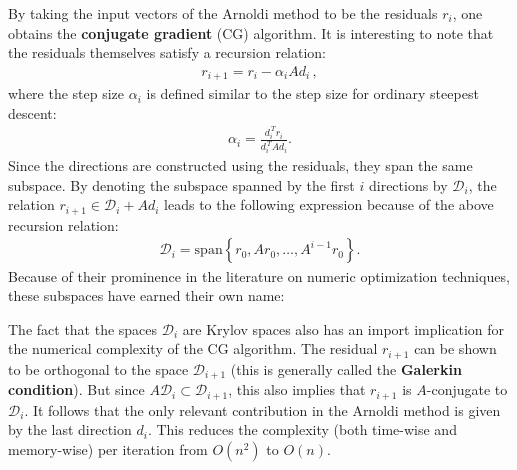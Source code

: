     By taking the input vectors of the Arnoldi method to be the residuals $r_i$, one obtains the \textbf{conjugate gradient} (CG) algorithm. It is interesting to note that the residuals themselves satisfy a recursion relation:
    \begin{gather}
        r_{i+1} = r_i - \alpha_iAd_i\,,
    \end{gather}
    where the step size $\alpha_i$ is defined similar to the step size for ordinary steepest descent:
    \begin{gather}
        \alpha_i = \frac{d_i^{\,T}r_i}{d_i^{\,T}\!Ad_i}.
    \end{gather}
    Since the directions are constructed using the residuals, they span the same subspace. By denoting the subspace spanned by the first $i$ directions by $\mathcal{D}_i$, the relation $r_{i+1}\in\mathcal{D}_i+Ad_i$ leads to the following expression because of the above recursion relation:
    \begin{gather}
        \mathcal{D}_i = \mathrm{span}\left\{r_0,Ar_0,\ldots,A^{i-1}r_0\right\}.
    \end{gather}
    Because of their prominence in the literature on numeric optimization techniques, these subspaces have earned their own name:

    The fact that the spaces $\mathcal{D}_i$ are Krylov spaces also has an import implication for the numerical complexity of the CG algorithm. The residual $r_{i+1}$ can be shown to be orthogonal to the space $\mathcal{D}_{i+1}$ (this is generally called the \textbf{Galerkin condition}). But since $A\mathcal{D}_i\subset\mathcal{D}_{i+1}$, this also implies that $r_{i+1}$ is $A$-conjugate to $\mathcal{D}_i$. It follows that the only relevant contribution in the Arnoldi method is given by the last direction $d_i$. This reduces the complexity (both time-wise and memory-wise) per iteration from $O(n^2)$ to $O(n)$.

